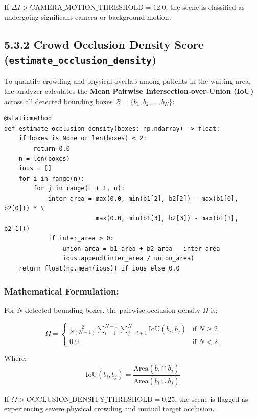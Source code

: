 If \(\Delta I > \text{CAMERA\_MOTION\_THRESHOLD} = 12.0\), the scene is
classified as undergoing significant camera or background motion.

\subsection{\texorpdfstring{5.3.2 Crowd Occlusion Density Score
(\texttt{estimate\_occlusion\_density})}{5.3.2 Crowd Occlusion Density Score (estimate\_occlusion\_density)}}\label{crowd-occlusion-density-score-estimate_occlusion_density}

To quantify crowding and physical overlap among patients in the waiting
area, the analyzer calculates the \textbf{Mean Pairwise
Intersection-over-Union (IoU)} across all detected bounding boxes
\(\mathcal{B} = \{ b_1, b_2, \dots, b_N \}\):

\begin{verbatim}
@staticmethod
def estimate_occlusion_density(boxes: np.ndarray) -> float:
    if boxes is None or len(boxes) < 2:
        return 0.0
    n = len(boxes)
    ious = []
    for i in range(n):
        for j in range(i + 1, n):
            inter_area = max(0.0, min(b1[2], b2[2]) - max(b1[0], b2[0])) * \
                         max(0.0, min(b1[3], b2[3]) - max(b1[1], b2[1]))
            if inter_area > 0:
                union_area = b1_area + b2_area - inter_area
                ious.append(inter_area / union_area)
    return float(np.mean(ious)) if ious else 0.0
\end{verbatim}

\subsubsection{Mathematical
Formulation:}\label{mathematical-formulation-1}

For \(N\) detected bounding boxes, the pairwise occlusion density
\(\Omega\) is:

\[\Omega = \begin{cases} \frac{2}{N(N-1)} \sum_{i=1}^{N-1} \sum_{j=i+1}^N \text{IoU}(b_i, b_j) & \text{if } N \ge 2 \\ 0.0 & \text{if } N < 2 \end{cases}\]

Where:
\[\text{IoU}(b_i, b_j) = \frac{\text{Area}(b_i \cap b_j)}{\text{Area}(b_i \cup b_j)}\]

If \(\Omega > \text{OCCLUSION\_DENSITY\_THRESHOLD} = 0.25\), the scene
is flagged as experiencing severe physical crowding and mutual target
occlusion.

